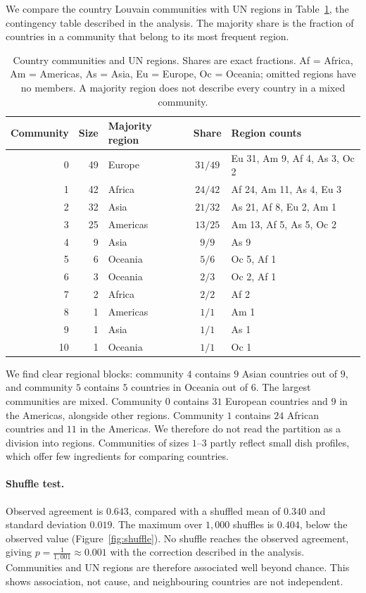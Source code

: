 We compare the country Louvain communities with UN regions in
Table~\ref{tab:regions}, the contingency table described in the analysis.
The majority share is the fraction of countries in a
community that belong to its most frequent region.

\begin{table}[h]
\centering
\small
\setlength{\tabcolsep}{4pt}
\begin{tabular}{@{}r r l c l@{}}
\toprule
Community & Size & Majority region & Share & Region counts \\
\midrule
0 & 49 & Europe & $31/49$ & Eu 31, Am 9, Af 4, As 3, Oc 2 \\
1 & 42 & Africa & $24/42$ & Af 24, Am 11, As 4, Eu 3 \\
2 & 32 & Asia & $21/32$ & As 21, Af 8, Eu 2, Am 1 \\
3 & 25 & Americas & $13/25$ & Am 13, Af 5, As 5, Oc 2 \\
4 & 9 & Asia & $9/9$ & As 9 \\
5 & 6 & Oceania & $5/6$ & Oc 5, Af 1 \\
6 & 3 & Oceania & $2/3$ & Oc 2, Af 1 \\
7 & 2 & Africa & $2/2$ & Af 2 \\
8 & 1 & Americas & $1/1$ & Am 1 \\
9 & 1 & Asia & $1/1$ & As 1 \\
10 & 1 & Oceania & $1/1$ & Oc 1 \\
\bottomrule
\end{tabular}
\caption{Country communities and UN regions. Shares are exact fractions.
Af = Africa, Am = Americas, As = Asia, Eu = Europe, Oc = Oceania;
omitted regions have no members. A majority region does not describe every
country in a mixed community.}
\label{tab:regions}
\end{table}

We find clear regional blocks: community $4$ contains $9$ Asian countries
out of $9$, and community $5$ contains $5$ countries in Oceania out of $6$.
The largest communities are mixed. Community $0$ contains $31$ European
countries and $9$ in the Americas, alongside other regions. Community $1$
contains $24$ African countries and $11$ in the Americas. We therefore do
not read the partition as a division into regions. Communities of sizes
$1$--$3$ partly reflect small dish profiles, which offer few ingredients
for comparing countries.

\paragraph{Shuffle test.}
Observed agreement is $0.643$, compared with a shuffled mean of $0.340$
and standard deviation $0.019$. The maximum over $1{,}000$ shuffles is
$0.404$, below the observed value (Figure~\ref{fig:shuffle}). No shuffle
reaches the observed agreement, giving $p=\frac{1}{1{,}001}\approx0.001$ with the
correction described in the analysis. Communities and UN regions are
therefore associated well beyond chance. This shows association, not cause,
and neighbouring countries are not independent.

